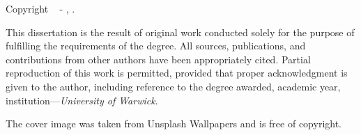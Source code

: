 
\begin{titlepage}

\vspace*{\fill}

{%
    \noindent \textbf{\GetTitle}
    
    \noindent Copyright \textcopyright~\the\year{} - \GetFirstAuthor, \GetSchool.
    
    \vspace{.575em}

    \noindent This dissertation is the result of original work conducted solely for the purpose of fulfilling the requirements of the degree. All sources, publications, and contributions from other authors have been appropriately cited. Partial reproduction of this work is permitted, provided that proper acknowledgment is given to the author, including reference to the degree awarded, academic year, institution---\textit{University of Warwick}.

    \vspace{2.4em}
    
    \noindent{}
    
    \vspace{.935em}

    \noindent The cover image was taken from Unsplash Wallpapers and is free of copyright.
}

\vspace*{\fill}

\end{titlepage}
